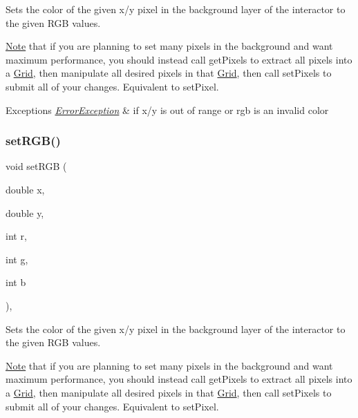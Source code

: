 Sets the color of the given x/y pixel in the background layer of the interactor to the given R\+GB values. 

\mbox{\hyperlink{classNote}{Note}} that if you are planning to set many pixels in the background and want maximum performance, you should instead call get\+Pixels to extract all pixels into a \mbox{\hyperlink{classGrid}{Grid}}, then manipulate all desired pixels in that \mbox{\hyperlink{classGrid}{Grid}}, then call set\+Pixels to submit all of your changes. Equivalent to set\+Pixel.


\begin{DoxyExceptions}{Exceptions}
{\em \mbox{\hyperlink{classErrorException}{Error\+Exception}}} & if x/y is out of range or rgb is an invalid color \\
\hline
\end{DoxyExceptions}
\mbox{\label{classGDrawingSurface_a81202471d4fc9f2015aef0bc073acfab}} 
\subsubsection{\texorpdfstring{set\+R\+G\+B()}{setRGB()}\hspace{0.1cm}{\footnotesize\ttfamily [2/3]}}
{\footnotesize\ttfamily void set\+R\+GB (\begin{DoxyParamCaption}\item[{double}]{x,  }\item[{double}]{y,  }\item[{int}]{r,  }\item[{int}]{g,  }\item[{int}]{b }\end{DoxyParamCaption})\hspace{0.3cm}{\ttfamily [virtual]}, {\ttfamily [inherited]}}



Sets the color of the given x/y pixel in the background layer of the interactor to the given R\+GB values. 

\mbox{\hyperlink{classNote}{Note}} that if you are planning to set many pixels in the background and want maximum performance, you should instead call get\+Pixels to extract all pixels into a \mbox{\hyperlink{classGrid}{Grid}}, then manipulate all desired pixels in that \mbox{\hyperlink{classGrid}{Grid}}, then call set\+Pixels to submit all of your changes. Equivalent to set\+Pixel.


